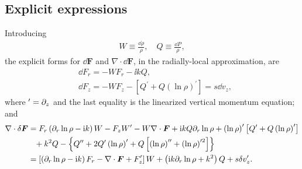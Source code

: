 \subsection{Explicit expressions}
Introducing
\begin{align}
  W \equiv \frac{\dd\rho}{\rho}, \quad Q \equiv \frac{\dd P}{\rho},
\end{align}
the explicit forms for $\dd\bm{F}$ and $\nabla\cdot\dd\bm{F}$, in the
radially-local approximation, are
\begin{align}
  &\dd F_r = - W F_r - \ii k Q,\\
  &\dd F_z = - W F_z - \left[Q^\prime + Q
    \left(\ln{\rho}\right)^\prime\right]  = s\dd v_z, 
\end{align} 
where $^\prime = \partial_z$ and the last equality is the linearized
vertical momentum equation; and 
\begin{align}
  \nabla\cdot\delta\bm{F} &= F_r\left(\partial_r\ln{\rho} - \mathrm{i} k \right)W - F_z
  W^\prime - W \nabla\cdot\bm{F} + \mathrm{i} kQ \partial_r\ln{\rho} +
  \left(\ln{\rho}\right)^\prime\left[Q^\prime + Q
    \left(\ln{\rho}\right)^\prime\right] \notag\\
  & \phantom{=} + k^2 Q - \left\{Q^{\prime\prime} + 2
    Q^\prime\left(\ln{\rho}\right)^\prime
    + Q\left[\left(\ln{\rho}\right)^{\prime\prime}+\left(\ln{\rho}\right)^{\prime
      2}\right]\right\}\notag\\
    &= \left[\left(\partial_r\ln{\rho}-\mathrm{i} k\right)F_r - \nabla\cdot\bm{F} +
      F_z^\prime\right]W + \left(\mathrm{i} k \partial_r\ln{\rho} + k^2\right)Q +
    s\delta v_z^\prime.
\end{align}




